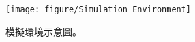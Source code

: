 \vskip 30pt
\begin{figure}[H]
\centering
\texttt{[image: figure/Simulation\_Environment]}
\caption{\label{fig:Sim_Environment}模擬環境示意圖。}
\end{figure}

